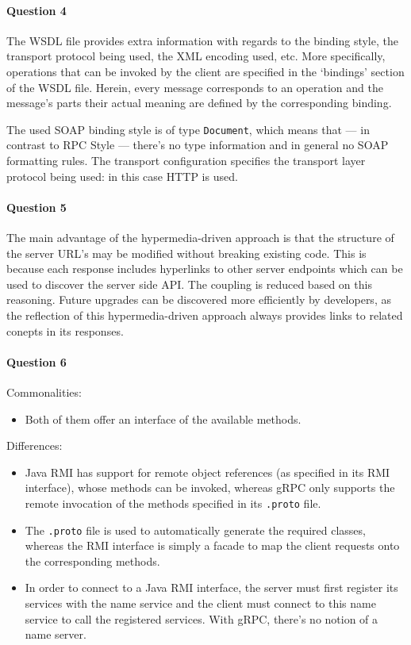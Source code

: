 \documentclass{ds-report}
\begin{document}
	\paragraph{Question 4} The WSDL file provides extra information with regards to the binding style, the transport protocol being used, the XML encoding used, etc. More specifically, operations that can be invoked by the client are specified in the `bindings' section of the WSDL file. Herein, every message corresponds to an operation and the message's parts their actual meaning are defined by the corresponding binding.
	
	The used SOAP binding style is of type \texttt{Document}, which means that --- in contrast to RPC Style --- there's no type information and in general no SOAP formatting rules. The transport configuration specifies the transport layer protocol being used: in this case HTTP is used. 
	
	\paragraph{Question 5} The main advantage of the hypermedia-driven approach is that the structure of the server URL's may be modified without breaking existing code. This is because each response includes hyperlinks to other server endpoints which can be used to discover the server side API. The coupling is reduced based on this reasoning. Future upgrades can be discovered more efficiently by developers, as the reflection of this hypermedia-driven approach always provides links to related conepts in its responses.

	\paragraph{Question 6}
	Commonalities:
	\begin{itemize}
		\item Both of them offer an interface of the available methods.
		
	\end{itemize}
	Differences:
	\begin{itemize}
		\item Java RMI has support for remote object references (as specified in its RMI interface), whose methods can be invoked, whereas gRPC only supports the remote invocation of the methods specified in its \texttt{.proto} file.
		\item The \texttt{.proto} file is used to automatically generate the required classes, whereas the RMI interface is simply a facade to map the client requests onto the corresponding methods.
		\item In order to connect to a Java RMI interface, the server must first register its services with the name service and the client must connect to this name service to call the registered services. With gRPC, there's no notion of a name server.
	\end{itemize}
\end{document}
